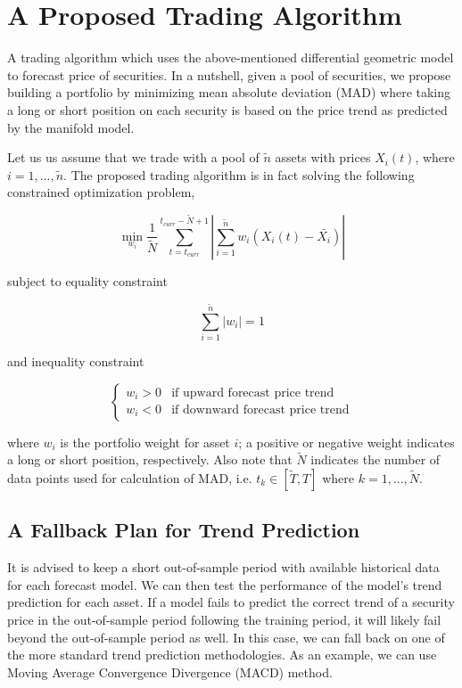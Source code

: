 \documentclass{article}
\begin{document}
\section{A Proposed Trading Algorithm}\label{section:trading-algorithm}

A trading algorithm which uses the above-mentioned differential
geometric model to forecast price of securities. In a nutshell, given
a pool of securities, we propose building a portfolio by minimizing
mean absolute deviation (MAD) where taking a long or short position on
each security is based on the price trend as predicted by the manifold
model.

Let us us assume that we trade with a pool of $\tilde{n}$ assets with
prices $X_{i}(t)$, where $i = 1, ...,\tilde{n}$. The proposed trading
algorithm is in fact solving the following constrained optimization
problem,

\begin{equation}\label{eqn:mad-optimization-problem}
\min_{w_{i}} \frac{1}{\tilde{N}}\sum_{t=t_{curr}}^{t_{curr}-\tilde{N}+1}
|\sum_{i=1}^{\tilde{n}} w_{i} (X_{i}(t)-\bar{X_{i}})|
\end{equation}

subject to equality constraint

\begin{equation}\label{eqn:mad-sum-constraint}
\sum_{i=1}^{\tilde{n}} |w_{i}| = 1
\end{equation}

and inequality constraint

\[
\begin{cases}\label{eqn:mad-trend-constraint}
    w_{i} > 0 & \text{if upward forecast price trend} \\
    w_{i} < 0 & \text{if downward forecast price trend}
\end{cases}
\]

where $w_{i}$ is the portfolio weight for asset $i$; a positive or
negative weight indicates a long or short position, respectively. Also
note that $\tilde{N}$ indicates the number of data points used for
calculation of MAD, i.e. $t_{k} \in [\tilde{T},T]$ where $k = 1,
...,\tilde{N}$.

\subsection{A Fallback Plan for Trend Prediction}\label{subsection:fallback-macd}

It is advised to keep a short out-of-sample period with available
historical data for each forecast model. We can then test the
performance of the model's trend prediction for each asset. If a model
fails to predict the correct trend of a security price in the
out-of-sample period following the training period, it will likely
fail beyond the out-of-sample period as well. In this case, we can
fall back on one of the more standard trend prediction
methodologies. As an example, we can use Moving Average Convergence
Divergence (MACD) method.
\end{document}

